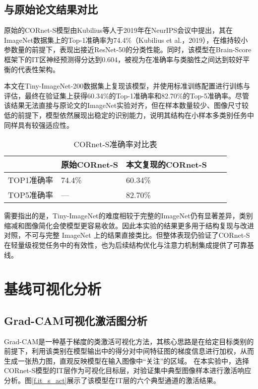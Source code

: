 \subsection{与原始论文结果对比}

原始的CORnet-S模型由Kubilius等人于2019年在NeurIPS会议中提出，其在ImageNet数据集上的Top-1准确率为74.4\%（Kubilius et al.，2019），在维持较小参数量的前提下，表现出接近ResNet-50的分类性能。同时，该模型在Brain-Score框架下的IT区神经预测得分达到0.604，被视为在准确率与类脑性之间达到较好平衡的代表性架构。

本文在Tiny-ImageNet-200数据集上复现该模型，并使用标准训练配置进行训练与评估，最终在验证集上获得60.34\%的Top-1准确率和82.70\%的Top-5准确率。尽管该结果无法直接与原论文的ImageNet实验对齐，但在样本数量较少、图像尺寸较低的前提下，模型依然展现出稳定的识别能力，说明其结构在小样本多类别任务中同样具有较强适应性。

\begin{table}[htb]
	\centering
	\caption{CORnet-S准确率对比表}
	\label{tab:CORnet-S}
	\begin{tabular}{lllll}
		\hline
		       & 原始CORnet-S & 本文复现的CORnet-S \\
		\hline
		TOP1准确率 & 74.4\% & 60.34\%   \\
		TOP5准确率 & — & 82.70\%    \\
		\hline
	\end{tabular}
\end{table}

需要指出的是，Tiny-ImageNet的难度相较于完整的ImageNet仍有显著差异，类别缩减和图像简化会使模型更容易收敛。因此本实验的结果更多用于结构复现与改进对照，不可与完整 ImageNet 上的结果直接类比。但整体表现仍验证了CORnet-S在轻量级视觉任务中的有效性，也为后续结构优化与注意力机制集成提供了可靠基线。

\section{基线可视化分析}

\subsection{Grad-CAM可视化激活图分析}

Grad-CAM是一种基于梯度的类激活可视化方法，其核心思路是在给定目标类别的前提下，利用该类别在模型输出中的得分对中间特征图的梯度信息进行加权，从而生成一张热力图，直观反映模型在输入图像中“关注”的区域。
在本实验中，选择CORnet-S模型的IT层作为可视化目标层，对验证集中典型图像样本进行激活响应分析。图\ref{f.it_s_act}展示了该模型在IT层的六个典型通道的激活结果。

